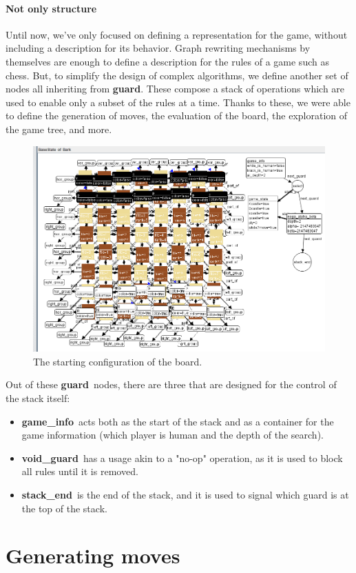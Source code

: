 \documentclass[a4paper, 10pt]{scrartcl}
\newcommand{\noderepr}[1]{\textsf{\textbf{#1}}}
\newcommand{\guard}{\noderepr{guard}}
\newcommand{\gameinfo}{\noderepr{game\_info}}
\newcommand{\void}{\noderepr{void\_guard}}
\newcommand{\stackend}{\noderepr{stack\_end}}
\begin{document}
    \paragraph*{Not only structure} Until now, we've only focused on defining a representation for the game, without including a description for its behavior. Graph rewriting mechanisms by themselves are enough to define a description for the rules of a game such as chess. But, to simplify the design of complex algorithms, we define another set of nodes all inheriting from \guard. These compose a stack of operations which are used to enable only a subset of the rules at a time. Thanks to these, we were able to define the generation of moves, the evaluation of the board, the exploration of the game tree, and more.
    \begin{figure}[H]
        \centering
        \includegraphics[width=.8\linewidth]{images/base_state.png}
        \caption{The starting configuration of the board.}
    \end{figure}
    Out of these \guard\ nodes, there are three that are designed for the control of the stack itself:
    \begin{itemize}
        \item \gameinfo\ acts both as the start of the stack and as a container for the game information (which player is human and the depth of the search).
        \item \void\ has a usage akin to a "no-op" operation, as it is used to block all rules until it is removed.
        \item \stackend\ is the end of the stack, and it is used to signal which guard is at the top of the stack.
    \end{itemize}

    \section{Generating moves}
\end{document}
